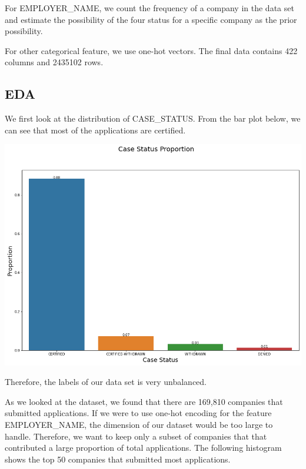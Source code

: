 \documentclass{article}
\begin{document}
\begin{multicols}{2}
For EMPLOYER\_NAME, we count the frequency of a company in the data set and estimate the possibility of the four status for a specific company as the prior possibility.

For other categorical feature, we use one-hot vectors. The final data contains 422 columns and 2435102 rows. 

\subsection{EDA}

We first look at the distribution of CASE\_STATUS. From the bar plot below, we can see that most of the applications are certified. 

\includegraphics[scale=0.25]{figures/fig11.png}

Therefore, the labels of our data set is very unbalanced. 

As we looked at the dataset, we found that there are 169,810 companies that submitted applications. If we were to use one-hot encoding for the feature EMPLOYER\_NAME, the dimension of our dataset would be too large to handle. Therefore, we want to keep only a subset of companies that that contributed a large proportion of total applications. The following histogram shows the top 50 companies that submitted most applications.


\end{multicols}
\end{document}
